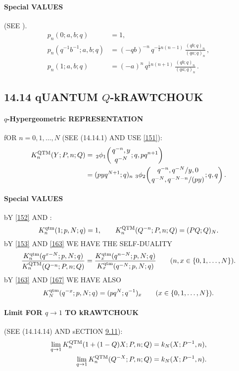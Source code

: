 \documentclass[twoside,11pt]{article}
\newcommand\half{\frac12}
\newcommand{\qhyp}[5]{\,\mbox{}_{#1}\phi_{#2}\!\left( 
  \genfrac{}{}{0pt}{}{#3}{#4};#5\right)}
\begin{document}
\paragraph{Special VALUES} 
(SEE \cite[\S2.4]{K17}). 
\begin{align} 
p_n(0;a,b;q)&=1,\label{127}\\ 
p_n(q^{-1}b^{-1};a,b;q)&=(-qb)^{-n}\,q^{-\half n(n-1)}\,\frac{(qb;q)_n}{(qa;q)_n}\,,\label{128}\\ 
p_n(1;a,b;q)&=(-a)^n\,q^{\half n(n+1)}\,\frac{(qb;q)_n}{(qa;q)_n}\,.\label{129} 
\end{align} 
% 
\subsection*{14.14 qUANTUM $Q$-kRAWTCHOUK} 
\label{sec14.14} 
% 
\paragraph{$q$-Hypergeometric REPRESENTATION} 
fOR $n=0,1,\ldots,N$ 
(SEE (14.14.1) AND USE \eqref{151}): 
\begin{align} 
K_n^{\rm QTM}(Y;P,n;Q) 
&=\qhyp21{q^{-n},y}{q^{-N}}{q,pq^{n+1}} 
\label{152}\\ 
&=(pyq^{N+1};q)_n\, 
\qhyp32{q^{-n},q^{-N}/y,0}{q^{-N},q^{-N-n}/(py)}{q,q}. 
\label{153} 
\end{align} 
% 
\paragraph{Special VALUES} 
bY \eqref{152} AND : 
\begin{equation} 
K_n^{\rm qtm}(1;p,N;q)=1,\qquad 
K_n^{\rm QTM}(Q^{-n};P,n;Q)=(PQ;Q)_N. 
\label{163} 
\end{equation} 
bY \eqref{153} AND \eqref{163} WE HAVE THE SELF-DUALITY 
\begin{equation} 
\frac{K_n^{\rm qtm}(q^{x-N};p,N;q)}{K_n^{\rm QTM}(Q^{-n};P,n;Q)} 
=\frac{K_x^{\rm qtm}(q^{n-N};p,N;q)}{K_x^{\rm qtm}(q^{-N};p,N;q)}\qquad 
(n,x\in\{0,1,\ldots,N\}). 
\label{167} 
\end{equation} 
bY \eqref{163} AND \eqref{167} WE HAVE ALSO 
\begin{equation} 
K_N^{\rm qtm}(q^{-x};p,N;q)=(pq^N;q^{-1})_x\qquad(x\in\{0,1,\ldots,N\}). 
\label{169} 
\end{equation} 
% 
\paragraph{Limit FOR $q\to1$ TO kRAWTCHOUK} (SEE (14.14.14) AND sECTION \hyperref[sec9.11]{9.11}): 
\begin{align} 
\lim_{q\to1} K_n^{\rm QTM}(1+(1-Q)X;P,n;Q)&=k_N(X;P^{-1},n), 
\label{161}\\ 
\lim_{q\to1} K_n^{\rm QTM}(Q^{-X};P,n;Q)&=k_N(X;P^{-1},n). 
\label{164} 
\end{align} 
% 
\end{document}
